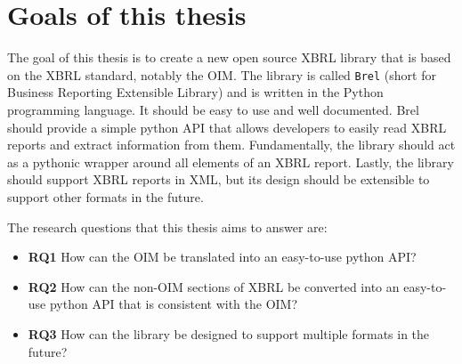 
\section{Goals of this thesis}
\label{sec:goals}

The goal of this thesis is to create a new open source XBRL library that is based on the XBRL standard, notably the OIM.
The library is called \texttt{Brel} (short for Business Reporting Extensible Library) and is written in the Python programming language.
It should be easy to use and well documented.
Brel should provide a simple python API that allows developers to easily read XBRL reports and extract information from them.
Fundamentally, the library should act as a pythonic wrapper around all elements of an XBRL report.
Lastly, the library should support XBRL reports in XML, but its design should be extensible to support other formats in the future.

The research questions that this thesis aims to answer are:

\begin{itemize}
    \item \textbf{RQ1} How can the OIM be translated into an easy-to-use python API?\label{itm:research_question_1}
    \item \textbf{RQ2} How can the non-OIM sections of XBRL be converted into an easy-to-use python API that is consistent with the OIM?\label{itm:research_question_2}
    \item \textbf{RQ3} How can the library be designed to support multiple formats in the future?\label{itm:research_question_3}
\end{itemize}


